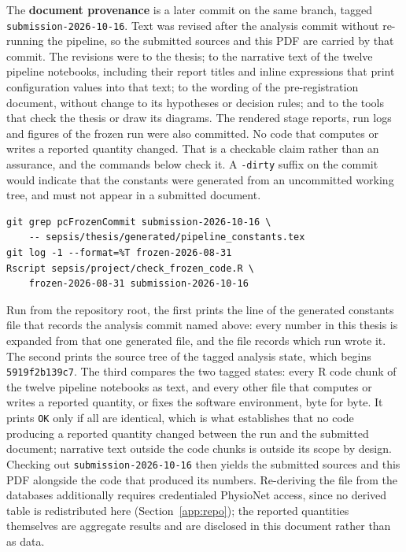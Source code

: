 The \textbf{document provenance} is a later commit on the same branch, tagged
\texttt{submission-2026-10-16}. Text was revised after the analysis commit
without re-running the pipeline, so the submitted sources and this PDF are
carried by that commit. The revisions were to the thesis; to the narrative text
of the twelve pipeline notebooks, including their report titles and inline
expressions that print configuration values into that text; to the wording of
the pre-registration document, without change to its hypotheses or decision
rules; and to the tools that check the thesis or draw its diagrams. The
rendered stage reports, run logs and figures of the frozen run were also
committed. No code that computes or writes a reported quantity changed. That
is a checkable
claim rather than an assurance, and the commands below check it. A
\texttt{-dirty} suffix on the commit would indicate that the constants were
generated from an uncommitted working tree, and must not appear in a submitted
document.

\begin{verbatim}
git grep pcFrozenCommit submission-2026-10-16 \
    -- sepsis/thesis/generated/pipeline_constants.tex
git log -1 --format=%T frozen-2026-08-31
Rscript sepsis/project/check_frozen_code.R \
    frozen-2026-08-31 submission-2026-10-16
\end{verbatim}

\noindent Run from the repository root, the first prints the line of the
generated constants file that records the analysis commit named above: every
number in this thesis is expanded from that one generated
file, and the file records which run wrote it. The second prints the source
tree of the tagged analysis state, which begins \texttt{5919f2b139c7}. The
third compares the two tagged states: every R code chunk of the twelve pipeline
notebooks as text, and every other file that computes or writes a reported
quantity, or fixes the software environment, byte for byte. It prints \texttt{OK} only if all are identical, which is what establishes that no
code producing a reported quantity changed between the run and the submitted
document; narrative
text outside the code chunks is outside its scope by design. Checking out
\texttt{submission-2026-10-16} then yields the submitted sources and this PDF
alongside the code that produced its numbers. Re-deriving the file from the
databases additionally requires credentialed PhysioNet access, since no derived
table is redistributed here (Section~\ref{app:repo}); the reported quantities
themselves are aggregate results and are disclosed in this document rather
than as data.

